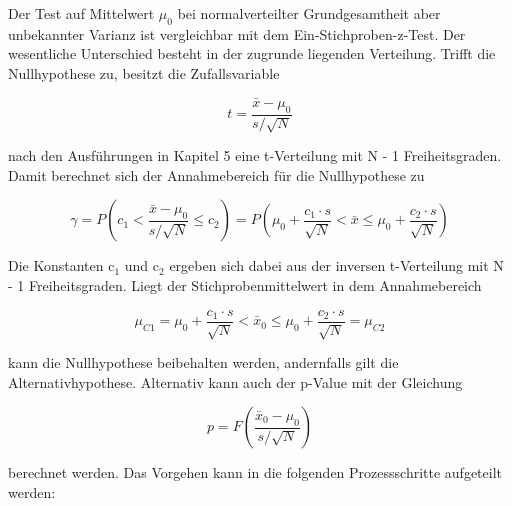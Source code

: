 \noindent Der Test auf Mittelwert $\mu_{0}$ bei normalverteilter Grundgesamtheit aber unbekannter Varianz ist vergleichbar mit dem Ein-Stichproben-z-Test. Der wesentliche Unterschied besteht in der zugrunde liegenden Verteilung. Trifft die Nullhypothese zu, besitzt die Zufallsvariable 

\begin{equation}\label{eq:sixninety}
t=\dfrac{\bar{x}-\mu _{0}}{s/\sqrt{N}}
\end{equation}

\noindent nach den Ausf\"{u}hrungen in Kapitel 5 eine t-Verteilung mit N - 1 Freiheitsgraden. Damit berechnet sich der Annahmebereich f\"{u}r die Nullhypothese zu

\begin{equation}\label{eq:sixninetyone}
\gamma =P\left(c_{1} <\dfrac{\bar{x}-\mu _{0} }{s/\sqrt{N}} \le c_{2} \right)=P\left(\mu _{0} +\dfrac{c_{1} \cdot s}{\sqrt{N}} <\bar{x}\le \mu _{0} +\dfrac{c_{2} \cdot s}{\sqrt{N}} \right)
\end{equation}

\noindent Die Konstanten c$_{1}$ und c$_{2}$ ergeben sich dabei aus der inversen t-Verteilung mit N - 1 Freiheitsgraden. Liegt der Stichprobenmittelwert in dem Annahmebereich

\begin{equation}\label{eq:sixninetytwo}
\mu _{C1} =\mu _{0} +\dfrac{c_{1} \cdot s}{\sqrt{N} } <\bar{x}_{0} \le \mu _{0} +\dfrac{c_{2} \cdot s}{\sqrt{N} } =\mu _{C2}
\end{equation}

\noindent kann die Nullhypothese beibehalten werden, andernfalls gilt die Alternativhypothese. Alternativ kann auch der p-Value mit der Gleichung

\begin{equation}\label{eq:sixninetythree}
p=F\left(\dfrac{\bar{x}_{0} -\mu _{0} }{s/\sqrt{N}} \right)
\end{equation}

\noindent berechnet werden. Das Vorgehen kann in die folgenden Prozessschritte aufgeteilt werden:

\clearpage

